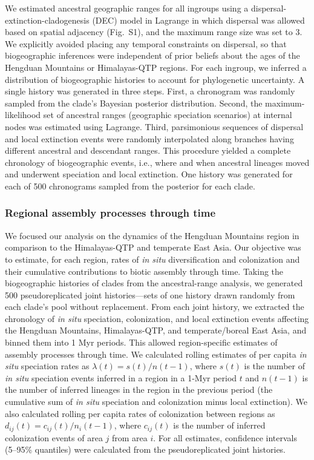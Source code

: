 We estimated ancestral geographic ranges for all ingroups using a dispersal-extinction-cladogenesis (DEC) model in Lagrange \citep{Ree2005,Ree2008} in which dispersal was allowed based on spatial adjacency
(Fig.~S1), and the maximum range size was set to 3. We explicitly avoided placing any temporal constraints on dispersal, so that biogeographic inferences were independent of prior beliefs about the ages of the Hengduan Mountains or Himalayas-QTP regions. For each ingroup, we inferred a distribution of biogeographic histories to account for phylogenetic uncertainty. A single history was generated in three steps. First, a chronogram was randomly sampled from the clade's Bayesian posterior distribution. Second, the maximum-likelihood set of ancestral ranges (geographic speciation scenarios) at internal nodes was estimated using Lagrange. Third, parsimonious sequences of dispersal and local extinction events were randomly interpolated along branches having different ancestral and descendant ranges. This procedure yielded a complete chronology of biogeographic events, i.e., where and when ancestral lineages moved and underwent speciation and local extinction. One history was generated for each of 500 chronograms sampled from the posterior for each clade.%

\subsubsection*{Regional assembly processes through time}

We focused our analysis on the dynamics of the Hengduan Mountains region in comparison to the Himalayas-QTP and temperate East Asia. Our objective was to estimate, for each region, rates of \textit{in situ} diversification and colonization and their cumulative contributions to biotic assembly through time. Taking the biogeographic histories of clades from the ancestral-range analysis, we generated 500 pseudoreplicated joint histories---sets of one history drawn randomly from each clade's pool without replacement. From each joint history, we extracted the chronology of \textit{in situ} speciation, colonization, and local extinction events affecting the Hengduan Mountains, Himalayas-QTP, and temperate/boreal East Asia, and binned them into 1 Myr periods. This allowed region-specific estimates of assembly processes through time. We calculated rolling estimates of per capita \textit{in situ} speciation rates as $\lambda(t) = s(t)/n(t-1)$, where $s(t)$ is the number of \textit{in situ} speciation events inferred in a region in a 1-Myr period $t$ and $n(t-1)$ is the number of inferred lineages in the region in the previous period (the cumulative sum of \textit{in situ} speciation and colonization minus local extinction). We also calculated rolling per capita rates of colonization between regions as $d_{ij}(t) = c_{ij}(t)/n_i(t-1)$, where $c_{ij}(t)$ is the number of inferred colonization events of area $j$ from area $i$. For all estimates, confidence intervals (5--95\% quantiles) were calculated from the pseudoreplicated joint histories.%

